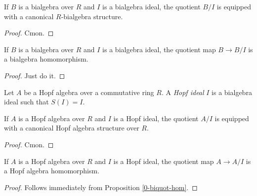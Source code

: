 \begin{proposition}
  \label{0-biquot}

  If $B$ is a bialgebra over $R$ and $I$ is a bialgebra ideal, the quotient $B / I$ is equipped with a canonical
  $R$-bialgebra structure.
\end{proposition}
\begin{proof}

  Cmon.
\end{proof}

\begin{proposition}
  \label{0-biquot-hom}

  If $B$ is a bialgebra over $R$ and $I$ is a bialgebra ideal, the quotient map $B \to B / I$ is a bialgebra homomorphism.
\end{proposition}
\begin{proof}

  Just do it.
\end{proof}

\begin{definition}
  \label{0-hopf-ideal}

  Let $A$ be a Hopf algebra over a commutative ring $R$. A \emph{Hopf ideal} $I$ is a bialgebra ideal
  such that $S(I)=I$.
\end{definition}

\begin{proposition}
  \label{0-hopf-quot}

  If $A$ is a Hopf algebra over $R$ and $I$ is a Hopf ideal, the quotient $A / I$ is equipped with a canonical
  Hopf algebra structure over $R$.
\end{proposition}
\begin{proof}

  Cmon.
\end{proof}

\begin{proposition}
  \label{0-hopf-quot-hom}

  If $A$ is a Hopf algebra over $R$ and $I$ is a Hopf ideal, the quotient map $A \to A / I$ is a Hopf algebra homomorphism.
\end{proposition}
\begin{proof}

  Follows immediately from Proposition \ref{0-biquot-hom}.
\end{proof}

